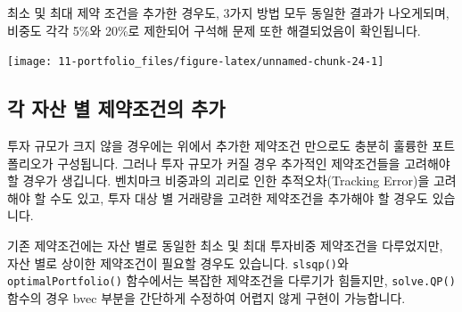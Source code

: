 \documentclass[12pt,]{book}
\newenvironment{Shaded}{\begin{snugshade}}{\end{snugshade}}
\newcommand{\DataTypeTok}[1]{\textcolor[rgb]{0.13,0.29,0.53}{#1}}
\newcommand{\DecValTok}[1]{\textcolor[rgb]{0.00,0.00,0.81}{#1}}
\newcommand{\FloatTok}[1]{\textcolor[rgb]{0.00,0.00,0.81}{#1}}
\newcommand{\KeywordTok}[1]{\textcolor[rgb]{0.13,0.29,0.53}{\textbf{#1}}}
\newcommand{\NormalTok}[1]{#1}
\newcommand{\OperatorTok}[1]{\textcolor[rgb]{0.81,0.36,0.00}{\textbf{#1}}}
\newcommand{\OtherTok}[1]{\textcolor[rgb]{0.56,0.35,0.01}{#1}}
\newcommand{\StringTok}[1]{\textcolor[rgb]{0.31,0.60,0.02}{#1}}
\begin{document}
최소 및 최대 제약 조건을 추가한 경우도, 3가지 방법 모두 동일한 결과가 나오게되며, 비중도 각각 5\%와 20\%로 제한되어 구석해 문제 또한 해결되었음이 확인됩니다.

\begin{Shaded}
\end{Shaded}

\begin{center}\texttt{[image: 11-portfolio\_files/figure-latex/unnamed-chunk-24-1]} \end{center}

\hypertarget{section-72}{%
\subsection{각 자산 별 제약조건의 추가}\label{section-72}}

투자 규모가 크지 않을 경우에는 위에서 추가한 제약조건 만으로도 충분히 훌륭한 포트폴리오가 구성됩니다. 그러나 투자 규모가 커질 경우 추가적인 제약조건들을 고려해야 할 경우가 생깁니다. 벤치마크 비중과의 괴리로 인한 추적오차(Tracking Error)을 고려해야 할 수도 있고, 투자 대상 별 거래량을 고려한 제약조건을 추가해야 할 경우도 있습니다.

기존 제약조건에는 자산 별로 동일한 최소 및 최대 투자비중 제약조건을 다루었지만, 자산 별로 상이한 제약조건이 필요할 경우도 있습니다. \texttt{slsqp()}와 \texttt{optimalPortfolio()} 함수에서는 복잡한 제약조건을 다루기가 힘들지만, \texttt{solve.QP()} 함수의 경우 bvec 부분을 간단하게 수정하여 어렵지 않게 구현이 가능합니다.
\end{document}
